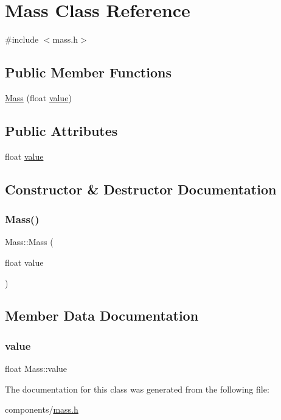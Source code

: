 \hypertarget{classMass}{}\section{Mass Class Reference}
\label{classMass}


{\ttfamily \#include $<$mass.\+h$>$}

\subsection*{Public Member Functions}
\begin{DoxyCompactItemize}
\item 
\hyperlink{classMass_ae7d9a813ae791bc44fbe52e18eef223e}{Mass} (float \hyperlink{classMass_a1c332d2b4b785512fc6fb77f2cf3f805}{value})
\end{DoxyCompactItemize}
\subsection*{Public Attributes}
\begin{DoxyCompactItemize}
\item 
float \hyperlink{classMass_a1c332d2b4b785512fc6fb77f2cf3f805}{value}
\end{DoxyCompactItemize}


\subsection{Constructor \& Destructor Documentation}
\mbox{\label{classMass_ae7d9a813ae791bc44fbe52e18eef223e}} 
\subsubsection{\texorpdfstring{Mass()}{Mass()}}
{\footnotesize\ttfamily Mass\+::\+Mass (\begin{DoxyParamCaption}\item[{float}]{value }\end{DoxyParamCaption})\hspace{0.3cm}{\ttfamily [inline]}}



\subsection{Member Data Documentation}
\mbox{\label{classMass_a1c332d2b4b785512fc6fb77f2cf3f805}} 
\subsubsection{\texorpdfstring{value}{value}}
{\footnotesize\ttfamily float Mass\+::value}



The documentation for this class was generated from the following file\+:\begin{DoxyCompactItemize}
\item 
components/\hyperlink{mass_8h}{mass.\+h}\end{DoxyCompactItemize}
